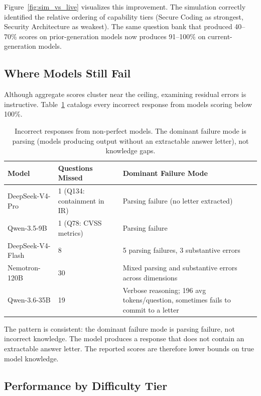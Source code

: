 \documentclass[final]{elsarticle}
\begin{document}
Figure~\ref{fig:sim_vs_live} visualizes this improvement. The simulation correctly identified the relative ordering of capability tiers (Secure Coding as strongest, Security Architecture as weakest). The same question bank that produced 40--70\% scores on prior-generation models now produces 91--100\% on current-generation models.

\subsection{Where Models Still Fail}

Although aggregate scores cluster near the ceiling, examining residual errors is instructive. Table~\ref{tab:failures} catalogs every incorrect response from models scoring below 100\%.

\begin{table}[t]
\centering
\caption{Incorrect responses from non-perfect models. The dominant failure mode is parsing (models producing output without an extractable answer letter), not knowledge gaps.}
\label{tab:failures}
\scriptsize
\begin{tabular}{llp{4cm}}
\toprule
\textbf{Model} & \textbf{Questions Missed} & \textbf{Dominant Failure Mode} \\
\midrule
DeepSeek-V4-Pro & 1 (Q134: containment in IR) & Parsing failure (no letter extracted) \\
Qwen-3.5-9B & 1 (Q78: CVSS metrics) & Parsing failure \\
DeepSeek-V4-Flash & 8 & 5 parsing failures, 3 substantive errors \\
Nemotron-120B & 30 & Mixed parsing and substantive errors across dimensions \\
Qwen-3.6-35B & 19 & Verbose reasoning; 196 avg tokens/question, sometimes fails to commit to a letter \\
\bottomrule
\end{tabular}
\end{table}

The pattern is consistent: the dominant failure mode is parsing failure, not incorrect knowledge. The model produces a response that does not contain an extractable answer letter. The reported scores are therefore lower bounds on true model knowledge.

\subsection{Performance by Difficulty Tier}
\end{document}
